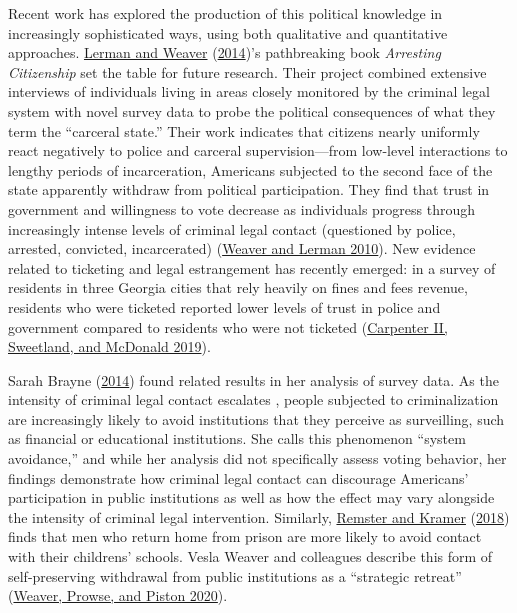 \documentclass[
  12pt,
]{article}
\begin{document}
Recent work has explored the production of this political knowledge in increasingly sophisticated ways, using both qualitative and quantitative approaches. \protect\hyperlink{ref-Lerman2014}{Lerman and Weaver} (\protect\hyperlink{ref-Lerman2014}{2014})'s pathbreaking book \emph{Arresting Citizenship} set the table for future research. Their project combined extensive interviews of individuals living in areas closely monitored by the criminal legal system with novel survey data to probe the political consequences of what they term the ``carceral state.'' Their work indicates that citizens nearly uniformly react negatively to police and carceral supervision---from low-level interactions to lengthy periods of incarceration, Americans subjected to the second face of the state apparently withdraw from political participation. They find that trust in government and willingness to vote decrease as individuals progress through increasingly intense levels of criminal legal contact (questioned by police, arrested, convicted, incarcerated) (\protect\hyperlink{ref-Weaver2010}{Weaver and Lerman 2010}). New evidence related to ticketing and legal estrangement has recently emerged: in a survey of residents in three Georgia cities that rely heavily on fines and fees revenue, residents who were ticketed reported lower levels of trust in police and government compared to residents who were not ticketed (\protect\hyperlink{ref-CarpenterII2019}{Carpenter II, Sweetland, and McDonald 2019}).

Sarah Brayne (\protect\hyperlink{ref-Brayne2014}{2014}) found related results in her analysis of survey data. As the intensity of criminal legal contact escalates , people subjected to criminalization are increasingly likely to avoid institutions that they perceive as surveilling, such as financial or educational institutions. She calls this phenomenon ``system avoidance,'' and while her analysis did not specifically assess voting behavior, her findings demonstrate how criminal legal contact can discourage Americans' participation in public institutions as well as how the effect may vary alongside the intensity of criminal legal intervention. Similarly, \protect\hyperlink{ref-Remster2018a}{Remster and Kramer} (\protect\hyperlink{ref-Remster2018a}{2018}) finds that men who return home from prison are more likely to avoid contact with their childrens' schools. Vesla Weaver and colleagues describe this form of self-preserving withdrawal from public institutions as a ``strategic retreat'' (\protect\hyperlink{ref-Weaver2020}{Weaver, Prowse, and Piston 2020}).
\end{document}
